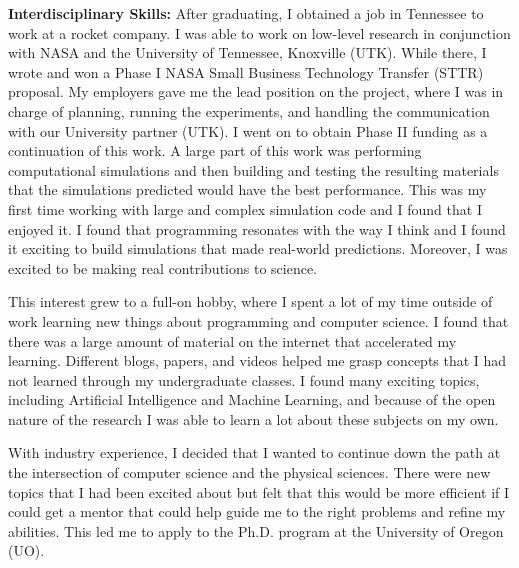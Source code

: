 \documentclass[12pt]{article}
\begin{document}
\textbf{Interdisciplinary Skills: }After graduating, I obtained a job in
Tennessee to work at a rocket company.  I was able to work on low-level research
in conjunction with NASA and the University of Tennessee, Knoxville (UTK). While
there, I wrote and won a Phase I NASA Small Business Technology Transfer (STTR)
proposal. My employers gave me the lead position on the project, where I was in
charge of planning, running the experiments, and handling the communication with
our University partner (UTK). I went on to obtain Phase II funding as a
continuation of this work. A large part of this work was performing
computational simulations and then building and testing the resulting materials
that the simulations predicted would have the best performance. This was my
first time working with large and complex simulation code and I found that I
enjoyed it. I found that programming resonates with the way I
think and I found it exciting to build simulations that made real-world
predictions. Moreover, I was excited to be making real contributions to science. 

This interest grew to a full-on hobby, where I spent a lot of my time outside of
work learning new things about programming and computer science. I found that
there was a large amount of material on the internet that accelerated my
learning. Different blogs, papers, and videos helped me grasp concepts that I
had not learned through my undergraduate classes. I found many exciting topics,
including Artificial Intelligence and Machine Learning, and because of the open
nature of the research I was able to learn a lot about these subjects on my own.

With industry experience, I decided that I wanted to continue down the path
at the intersection of computer science and the physical sciences. There were
new topics that I had been excited about but felt that this
would be more efficient if I could get a mentor that could help guide me to the
right problems and refine my abilities. This led me to apply to the Ph.D. program
at the University of Oregon (UO).
\end{document}
